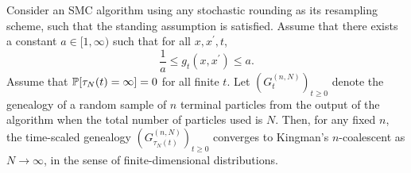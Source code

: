 \begin{corollary}\label{thm:stochrounding}
Consider an SMC algorithm using any stochastic rounding as its resampling scheme, such that the standing assumption is satisfied.
Assume that there exists a constant $a\in [1,\infty)$ such that for all $x, x^\prime, t$,
\begin{equation}
\frac{1}{a} \leq g_t(x, x^\prime) \leq a . %
\end{equation}
Assume that $\mathbb{P}[ \tau_N(t) = \infty] =0$ for all finite $t$.
Let $(G_t^{(n,N)})_{t\geq0}$ denote the genealogy of a random sample of $n$ terminal particles from the output of the algorithm when the total number of particles used is $N$. Then, for any fixed $n$, the time-scaled genealogy $(G_{\tau_N(t)}^{(n,N)})_{t\geq0}$ converges to Kingman's $n$-coalescent as $N\to \infty$, in the sense of finite-dimensional distributions.
\end{corollary}

